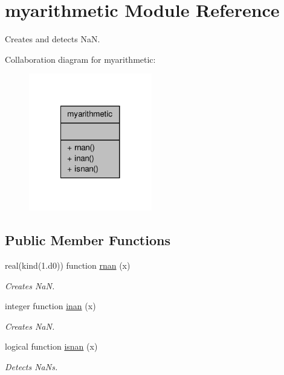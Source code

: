 \hypertarget{classmyarithmetic}{\section{myarithmetic Module Reference}
\label{classmyarithmetic}
}


Creates and detects Na\-N.  




Collaboration diagram for myarithmetic\-:\nopagebreak
\begin{figure}[H]
\begin{center}
\leavevmode
\includegraphics[width=152pt]{classmyarithmetic__coll__graph}
\end{center}
\end{figure}
\subsection*{Public Member Functions}
\begin{DoxyCompactItemize}
\item 
real(kind(1.d0)) function \hyperlink{classmyarithmetic_a5bfa55e975e245be29b376c7b2b6214f}{rnan} (x)
\begin{DoxyCompactList}\small\item\em Creates Na\-N. \end{DoxyCompactList}\item 
integer function \hyperlink{classmyarithmetic_a13e401cc199f6d40533cae2c20fac922}{inan} (x)
\begin{DoxyCompactList}\small\item\em Creates Na\-N. \end{DoxyCompactList}\item 
logical function \hyperlink{classmyarithmetic_ac0dec559e69eb7ec762b2eee93884e0f}{isnan} (x)
\begin{DoxyCompactList}\small\item\em Detects Na\-Ns. \end{DoxyCompactList}\end{DoxyCompactItemize}


